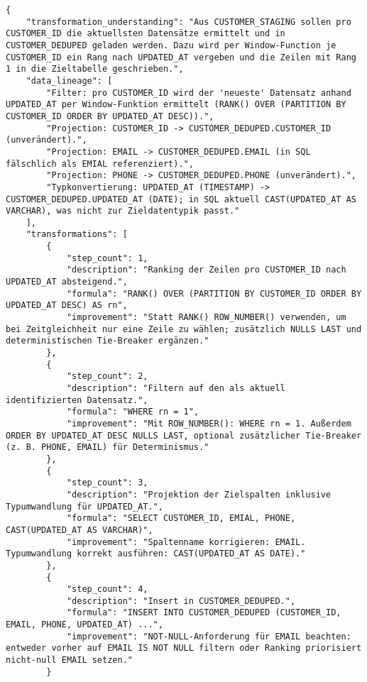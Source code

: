 \begin{lstlisting}[caption={Ausgabe: GPT-5 Anwendungsfall 2 Robustheitsdurchlauf},label={gpt_case2_prompt3}]
{
    "transformation_understanding": "Aus CUSTOMER_STAGING sollen pro CUSTOMER_ID die aktuellsten Datensätze ermittelt und in CUSTOMER_DEDUPED geladen werden. Dazu wird per Window-Function je CUSTOMER_ID ein Rang nach UPDATED_AT vergeben und die Zeilen mit Rang 1 in die Zieltabelle geschrieben.",
    "data_lineage": [
        "Filter: pro CUSTOMER_ID wird der 'neueste' Datensatz anhand UPDATED_AT per Window-Funktion ermittelt (RANK() OVER (PARTITION BY CUSTOMER_ID ORDER BY UPDATED_AT DESC)).",
        "Projection: CUSTOMER_ID -> CUSTOMER_DEDUPED.CUSTOMER_ID (unverändert).",
        "Projection: EMAIL -> CUSTOMER_DEDUPED.EMAIL (in SQL fälschlich als EMIAL referenziert).",
        "Projection: PHONE -> CUSTOMER_DEDUPED.PHONE (unverändert).",
        "Typkonvertierung: UPDATED_AT (TIMESTAMP) -> CUSTOMER_DEDUPED.UPDATED_AT (DATE); in SQL aktuell CAST(UPDATED_AT AS VARCHAR), was nicht zur Zieldatentypik passt."
    ],
    "transformations": [
        {
            "step_count": 1,
            "description": "Ranking der Zeilen pro CUSTOMER_ID nach UPDATED_AT absteigend.",
            "formula": "RANK() OVER (PARTITION BY CUSTOMER_ID ORDER BY UPDATED_AT DESC) AS rn",
            "improvement": "Statt RANK() ROW_NUMBER() verwenden, um bei Zeitgleichheit nur eine Zeile zu wählen; zusätzlich NULLS LAST und deterministischen Tie-Breaker ergänzen."
        },
        {
            "step_count": 2,
            "description": "Filtern auf den als aktuell identifizierten Datensatz.",
            "formula": "WHERE rn = 1",
            "improvement": "Mit ROW_NUMBER(): WHERE rn = 1. Außerdem ORDER BY UPDATED_AT DESC NULLS LAST, optional zusätzlicher Tie-Breaker (z. B. PHONE, EMAIL) für Determinismus."
        },
        {
            "step_count": 3,
            "description": "Projektion der Zielspalten inklusive Typumwandlung für UPDATED_AT.",
            "formula": "SELECT CUSTOMER_ID, EMIAL, PHONE, CAST(UPDATED_AT AS VARCHAR)",
            "improvement": "Spaltenname korrigieren: EMAIL. Typumwandlung korrekt ausführen: CAST(UPDATED_AT AS DATE)."
        },
        {
            "step_count": 4,
            "description": "Insert in CUSTOMER_DEDUPED.",
            "formula": "INSERT INTO CUSTOMER_DEDUPED (CUSTOMER_ID, EMAIL, PHONE, UPDATED_AT) ...",
            "improvement": "NOT-NULL-Anforderung für EMAIL beachten: entweder vorher auf EMAIL IS NOT NULL filtern oder Ranking priorisiert nicht-null EMAIL setzen."
        }

\end{lstlisting}
